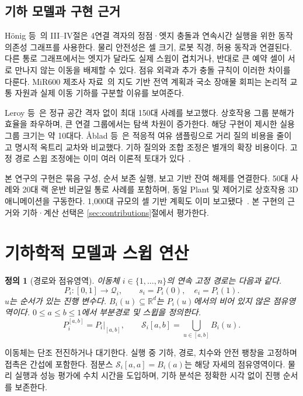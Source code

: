 \documentclass[11pt,a4paper]{article}
\newtheorem{definition}{정의}
\theoremstyle{remark}
\newcommand{\Sw}{\mathcal S}
\begin{document}
\subsection{기하 모델과 구현 근거}
H\"onig 등~\cite{hoenig2019}의 III--IV절은 4연결 격자의 정점·엣지 충돌과 연속시간 실행을 위한 동작 의존성 그래프를 사용한다. 물리 안전성은 셀 크기, 로봇 직경, 허용 동작과 연결된다. 다른 통로 그래프에서는 엣지가 달라도 실제 스윕이 겹치거나, 반대로 큰 예약 셀이 서로 만나지 않는 이동을 배제할 수 있다. 점유 외곽과 추가 충돌 규칙이 이러한 차이를 다룬다. MiR600 제조사 자료~\cite{mir600guide}의 지도 기반 전역 계획과 국소 장애물 회피는 논리적 교통 자원과 실제 이동 기하를 구분할 이유를 보여준다.

Leroy 등~\cite{leroy1999}은 정규 공간 격자 없이 최대 150대 사례를 보고했다. 상호작용 그룹 분해가 효율을 좌우하며, 큰 연결 그룹에서는 탐색 차원이 증가한다. 해당 구현이 제시한 실용 그룹 크기는 약 10대다. \AA blad 등~\cite{ablad2021}은 적응적 여유 샘플링으로 거리 질의 비용을 줄이고 명시적 옥트리 교차와 비교했다. 기하 질의와 조합 조정은 별개의 확장 비용이다. 고정 경로 스윕 조정에는 이미 여러 이론적 토대가 있다~\cite{odonnell1989,leroy1999,gregoire2015,cap2016}.

본 연구의 구현은 묶음 구성, 순서 보존 실행, 보고 기반 잔여 해제를 연결한다. 50대 사례와 20대 랙 운반 비균일 통로 사례를 포함하며, 동일 Plant 및 제어기로 상호작용 3D 애니메이션을 구동한다. 1,000대 규모의 셀 기반 계획도 이미 보고됐다~\cite{li2021}. 본 구현의 근거와 기하·계산 선택은 \ref{sec:contributions}절에서 평가한다.

\section{기하학적 모델과 스윕 연산}
\begin{definition}[경로와 점유영역]
이동체 $i\in\{1,\ldots,n\}$의 연속 고정 경로는 다음과 같다.
\begin{equation}
 P_i:[0,1]\longrightarrow\mathcal Q_i,\qquad
 s_i=P_i(0),\quad e_i=P_i(1).
 \label{eq:path}
\end{equation}
$u$는 순서가 있는 진행 변수다. $B_i(u)\subseteq\mathbb R^d$는 $P_i(u)$에서의 비어 있지 않은 점유영역이다. $0\le a\le b\le1$에서 부분경로 및 스윕을 정의한다.
\begin{equation}
 P_i^{[a,b]}=P_i|_{[a,b]},\qquad
 \Sw_i[a,b]=\bigcup_{u\in[a,b]}B_i(u).
 \label{eq:sweep}
\end{equation}
\end{definition}
이동체는 단조 전진하거나 대기한다. 실행 중 기하, 경로, 치수와 안전 팽창을 고정하며 접촉은 간섭에 포함한다. 점분스 $\Sw_i[a,a]=B_i(a)$는 해당 자세의 점유영역이다. 물리 실행과 성능 평가에 수치 시간을 도입하며, 기하 분석은 정확한 시각 없이 진행 순서를 보존한다.
\end{document}
